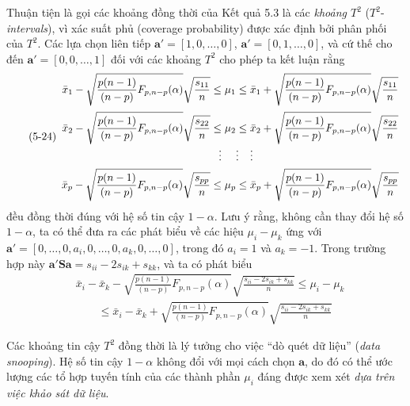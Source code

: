 \medskip
Thuận tiện là gọi các khoảng đồng thời của Kết quả 5.3 là các \emph{khoảng $T^2$} ($T^2$-\emph{intervals}), vì xác suất phủ (coverage probability) được xác định bởi phân phối của $T^2$. Các lựa chọn liên tiếp $\mathbf{a}'=[1,0,\dots,0]$, $\mathbf{a}'=[0,1,\dots,0]$, và cứ thế cho đến $\mathbf{a}'=[0,0,\dots,1]$ đối với các khoảng $T^2$ cho phép ta kết luận rằng
{\footnotesize\begin{equation}\tag{5-24}
\begin{array}{r@{\;}c@{\;}l}
  \bar{x}_1-\sqrt{\dfrac{p(n-1)}{(n-p)}F_{p,n-p}(\alpha)}\sqrt{\dfrac{s_{11}}{n}} \le & \mu_1 \le & \bar{x}_1+\sqrt{\dfrac{p(n-1)}{(n-p)}F_{p,n-p}(\alpha)}\sqrt{\dfrac{s_{11}}{n}}\\[14pt]
  \bar{x}_2-\sqrt{\dfrac{p(n-1)}{(n-p)}F_{p,n-p}(\alpha)}\sqrt{\dfrac{s_{22}}{n}} \le & \mu_2 \le & \bar{x}_2+\sqrt{\dfrac{p(n-1)}{(n-p)}F_{p,n-p}(\alpha)}\sqrt{\dfrac{s_{22}}{n}}\\[4pt]
  \vdots & \multicolumn{1}{c}{\vdots} & \vdots\\[4pt]
  \bar{x}_p-\sqrt{\dfrac{p(n-1)}{(n-p)}F_{p,n-p}(\alpha)}\sqrt{\dfrac{s_{pp}}{n}} \le & \mu_p \le & \bar{x}_p+\sqrt{\dfrac{p(n-1)}{(n-p)}F_{p,n-p}(\alpha)}\sqrt{\dfrac{s_{pp}}{n}}
\end{array}
\end{equation}}
đều đồng thời đúng với hệ số tin cậy $1-\alpha$. Lưu ý rằng, không cần thay đổi hệ số $1-\alpha$, ta có thể đưa ra các phát biểu về các hiệu $\mu_i-\mu_k$ ứng với $\mathbf{a}'=[0,\dots,0,a_i,0,\dots,0,a_k,0,\dots,0]$, trong đó $a_i=1$ và $a_k=-1$. Trong trường hợp này $\mathbf{a}'\mathbf{S}\mathbf{a}=s_{ii}-2s_{ik}+s_{kk}$, và ta có phát biểu
{\footnotesize\begin{equation}\tag{5-25}
\begin{aligned}
  &\bar{x}_i-\bar{x}_k-\sqrt{\tfrac{p(n-1)}{(n-p)}F_{p,n-p}(\alpha)}\sqrt{\frac{s_{ii}-2s_{ik}+s_{kk}}{n}} \le \mu_i-\mu_k\\
  &\qquad\le \bar{x}_i-\bar{x}_k+\sqrt{\tfrac{p(n-1)}{(n-p)}F_{p,n-p}(\alpha)}\sqrt{\frac{s_{ii}-2s_{ik}+s_{kk}}{n}}
\end{aligned}
\end{equation}}
 
Các khoảng tin cậy $T^2$ đồng thời là lý tưởng cho việc ``dò quét dữ liệu'' (\emph{data snooping}). Hệ số tin cậy $1-\alpha$ không đổi với mọi cách chọn $\mathbf{a}$, do đó có thể ước lượng các tổ hợp tuyến tính của các thành phần $\mu_i$ đáng được xem xét \emph{dựa trên việc khảo sát dữ liệu}.
 
